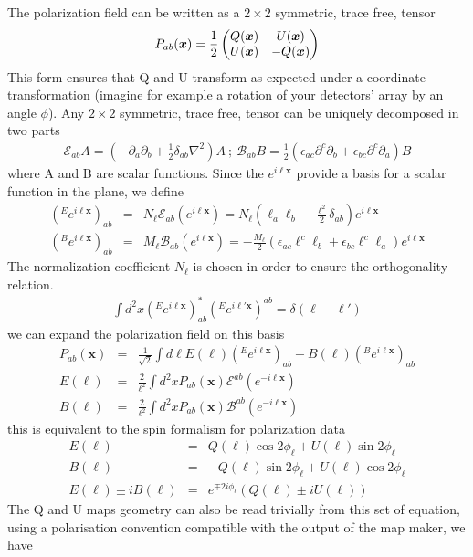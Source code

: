 \documentclass[a4paper, 11pt]{article}
\def\eop{\mathcal{E}}
\def\bop{\mathcal{B}}
\def\ba{\begin{eqnarray}}
\def\ea{\end{eqnarray}}
\begin{document}
The polarization field can be written as  a $2\times2$ symmetric, trace free, tensor 
\ba
P_{ab}(\bm{x})= \frac{1}{2}
\begin{pmatrix} 
Q(\bm{x}) & 
U(\bm{x}) \cr
U(\bm{x}) & 
-Q(\bm{x}) \cr
\end{pmatrix} 
\ea
This form ensures that Q and U transform as expected under a coordinate transformation (imagine for example a rotation of your detectors' array by an angle $\phi$).
Any $2\times2$ symmetric, trace free, tensor can be uniquely decomposed in two parts
\ba 
\eop_{ab} A=(-\partial_{a}\partial_{b}+ \frac{1}{2}\delta_{ab} \nabla^{2})A \ ; \ \bop_{ab}B=\frac{1}{2} (\epsilon_{ac}\partial^{c}\partial_{b} + \epsilon_{bc}\partial^{c}\partial_{a})B
\ea
where A and B are scalar functions. Since the $e^{i\bm{\ell} \bm{x}}$ provide a basis for a scalar function in the plane, we define
\ba
(^{E}e^{i\bm{\ell}\bm{x}})_{ab} &=& N_{\bm{\ell}} \eop_{ab} (e^{i\bm{\ell}\bm{x}})= N_{\bm{\ell}} ( \ell_{a}\ell_{b}- \frac{\bm{\ell}^{2}}{2}\delta_{ab})e^{i\bm{\ell}\bm{x}} \\
(^{B}e^{i\bm{\ell}\bm{x}})_{ab} &=& M_{\bm{\ell}}\bop_{ab} (e^{i\bm{\ell}\bm{x}})=- \frac{M_{\bm{\ell}}}{2} (\epsilon_{ac}\ell^{c}\ell_{b} + \epsilon_{bc}\ell^{c}\ell_{a}) e^{i\bm{\ell}\bm{x}}
\ea
The normalization coefficient $N_{\bm{\ell}}$ is chosen in order to ensure the orthogonality relation.
\ba
\int d^{2}x (^{E}e^{i\bm{\ell}\bm{x}})^{*}_{ab} (^{E}e^{i\bm{\ell}'\bm{x}})^ {ab} = \delta( \bm{\ell}-\bm{\ell}')
\ea
we can expand the polarization field on this basis
\ba
P_{ab}(\bm{x}) &=& \frac{1}{\sqrt{2}} \int d\bm{\ell} E(\bm{\ell}) (^{E}e^{i\bm{\ell}\bm{x}})_{ab} +B({\bm{\ell}}) (^{B}e^{i\bm{\ell}\bm{x}})_{ab} \\
 E({\bm{\ell}}) &=& \frac{2}{\ell^{2}} \int d^{2}x   P_{ab}(\bm{x})   \eop^{ab}(e^{-i\bm{\ell}\bm{x}}) \\
 B({\bm{\ell}}) &=& \frac{2}{\ell^{2}} \int d^{2}x   P_{ab}(\bm{x})  \bop^{ab}(e^{-i\bm{\ell}\bm{x}}) 
\ea
this is equivalent to the spin formalism for polarization data
\ba
E({\bm{\ell}}) &=& Q(\bm{\ell}) \cos 2\phi_{\bm{\ell}}+U(\bm{\ell})\sin 2\phi_{\bm{\ell}}   \\
B({\bm{\ell}}) &=& -Q(\bm{\ell})\sin 2\phi_{\bm{\ell}} +U(\bm{\ell}) \cos 2\phi_{\bm{\ell}}  \\
E({\bm{\ell}}) \pm i B({\bm{\ell}})&=& e^{\mp 2i\phi_{\bm{\ell}}}(Q(\bm{\ell}) \pm i U(\bm{\ell}))
\ea
The Q and U maps geometry can also be read trivially from this set of equation, using a polarisation convention compatible with the output of the map maker, we have
\end{document}
